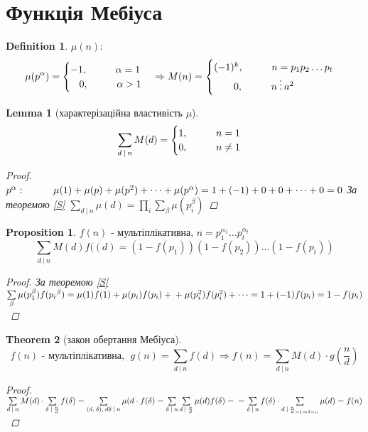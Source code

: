 \documentclass[a4paper,12pt]{bookest}
\newtheorem{theorem}{Theorem}[section]
\newtheorem{lemma}[theorem]{Lemma}
\newtheorem{definition}{Definition}[section]
\newtheorem*{prop*}{Proposition}
\newcommand\tab[1][1cm]{\hspace*{#1}}
\begin{document}
\section{Функція Мебіуса}
\begin{definition}
	$\mu(n):$ $$\mu(p^\alpha)=\begin{cases}
		-1,\tab \alpha=1\\\>\>\>\>0,\tab\alpha>1
	\end{cases}\Rightarrow M(n)=\begin{cases}
		(-1)^k,\tab n=p_1p_2\dots p_t\\\>\>\>\>\>\>\>\>\>0,\tab n\>\vdots\>a^2
	\end{cases}$$
\end{definition}
\begin{lemma}[характерізаційна властивість $\mu$]
	$$\sum\limits_{d\>|\>n}M(d)=\begin{cases}
		1,\tab n=1\\0,\tab n\neq 1
	\end{cases}$$
	\begin{proof}
		$p^\alpha:\tab \mu(1)+\mu(p)	+\mu(p^2)+\dots+\mu(p^\alpha)=1+(-1)+0+0+\dots+0=0\\$ За теоремою \ref{S} $\sum\limits_{d\>|\>n}\mu(d)=\prod\limits_{i}\sum\limits_{\beta}\mu(p_i^\beta)$
	\end{proof}
\end{lemma}
\begin{prop*}
$f(n)\textrm{ - мультіплікативна, }n=p_1^{\alpha_1}\dots p_t^{\alpha_t}$
$$\sum\limits_{d\>|\>n}M(d)f((d)=(1-f(p_1))(1-f(p_2))\dots(1-f(p_t))$$
\begin{proof}
	За теоремою \ref{S} $\sum\limits_{\beta}\mu(p_1^{\beta})f(p_i{^\beta})=\mu(1)f(1)+\mu(p_i)f(p_i)+\\+\mu(p_i^2)f(p_i^2)+\dots=1+(-1)f(p_i)=1-f(p_i)$
\end{proof}
\end{prop*}
\begin{theorem}[закон обертання Мебіуса]
	$$f(n) \textrm{ - мультіплікативна},\>\>g(n)	=\sum\limits_{d\>|\>n}f(d)\Rightarrow f(n)=\sum\limits_{d\>|\>n}M(d)\cdot g(\frac nd)$$
	\begin{proof}
		$\sum\limits_{d\>|\>n}M(d)\cdot\sum\limits_{\delta\>|\>\frac nd}f(\delta)=\sum\limits_{(d,\>\delta),\>d\delta\>|\>n}\mu(	d\cdot f(\delta)=\sum\limits_{\delta\>|\>n}\sum\limits_{d\>|\>\frac nd}\mu(d)f(\delta)=\\=\sum\limits_{\delta\>|\>n}f(\delta)\cdot\sum\limits_{d\>|\>\frac nd_{=1\Rightarrow\delta=n}}\mu(d)=f(n)$
	\end{proof}
\end{theorem}
\end{document}
